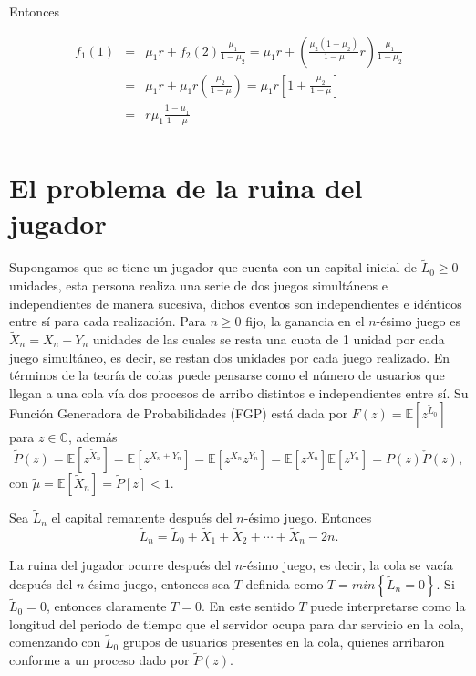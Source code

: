 \documentclass{article}
\newcommand{\esp}{\mathbb{E}}
\numberwithin{equation}{section}
\begin{document}
Entonces

\begin{eqnarray*}
f_{1}\left(1\right)&=&\mu_{1}r+f_{2}\left(2\right)\frac{\mu_{1}}{1-\mu_{2}}=\mu_{1}r+\left(\frac{\mu_{2}\left(1-\mu_{2}\right)}{1-\mu}r\right)\frac{\mu_{1}}{1-\mu_{2}}\\
&=&\mu_{1}r+\mu_{1}r\left(\frac{\mu_{2}}{1-\mu}\right)=\mu_{1}r\left[1+\frac{\mu_{2}}{1-\mu}\right]\\
&=&r\mu_{1}\frac{1-\mu_{1}}{1-\mu}\\
\end{eqnarray*}

\section{El problema de la ruina del jugador}

Supongamos que se tiene un jugador que cuenta con un capital inicial de $\tilde{L}_{0}\geq0$ unidades, esta persona realiza una serie de dos juegos simult\'aneos e independientes de manera sucesiva, dichos eventos son independientes e id\'enticos entre s\'i para cada realizaci\'on. Para $n\geq0$ fijo, la ganancia en el $n$-\'esimo juego es $\tilde{X}_{n}=X_{n}+Y_{n}$ unidades de las cuales se resta una cuota de 1 unidad por cada juego simult\'aneo, es decir, se restan dos unidades por cada juego realizado. En t\'erminos de la teor\'ia de colas puede pensarse como el n\'umero de usuarios que llegan a una cola v\'ia dos procesos de arribo distintos e independientes entre s\'i. Su Funci\'on Generadora de Probabilidades (FGP) est\'a dada por $F\left(z\right)=\esp\left[z^{\tilde{L}_{0}}\right]$ para $z\in\mathbb{C}$, adem\'as
$$\tilde{P}\left(z\right)=\esp\left[z^{\tilde{X}_{n}}\right]=\esp\left[z^{X_{n}+Y_{n}}\right]=\esp\left[z^{X_{n}}z^{Y_{n}}\right]=\esp\left[z^{X_{n}}\right]\esp\left[z^{Y_{n}}\right]=P\left(z\right)\check{P}\left(z\right),$$ con $\tilde{\mu}=\esp\left[\tilde{X}_{n}\right]=\tilde{P}\left[z\right]<1$. 

Sea $\tilde{L}_{n}$ el capital remanente despu\'es del $n$-\'esimo
juego. Entonces
$$\tilde{L}_{n}=\tilde{L}_{0}+\tilde{X}_{1}+\tilde{X}_{2}+\cdots+\tilde{X}_{n}-2n.$$

La ruina del jugador ocurre despu\'es del $n$-\'esimo juego, es decir, la cola se vac\'ia despu\'es del $n$-\'esimo juego, entonces sea $T$ definida como $T=min\left\{\tilde{L}_{n}=0\right\}$. Si $\tilde{L}_{0}=0$, entonces claramente $T=0$. En este sentido $T$ puede interpretarse como la longitud del periodo de tiempo que el servidor ocupa para dar servicio en la cola, comenzando con $\tilde{L}_{0}$ grupos de usuarios presentes en la cola, quienes arribaron conforme a un proceso dado por $\tilde{P}\left(z\right)$.
\end{document}
